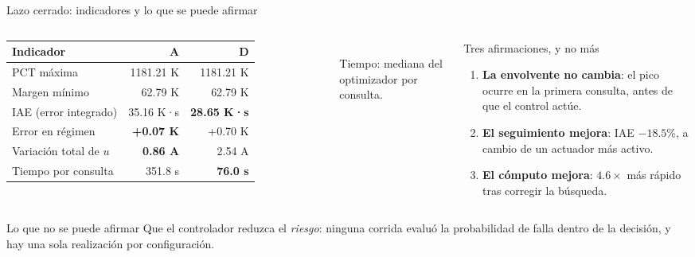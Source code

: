 \documentclass[aspectratio=169,10pt]{beamer}
\newcommand{\key}[1]{{\color{USMBlue}\bfseries #1}}
\begin{document}
\begin{frame}{Lazo cerrado: indicadores y lo que se puede afirmar}
\begin{columns}[T]
\small
\begin{tabular}{@{}lrr@{}}
\toprule
Indicador & A & D\\
\midrule
PCT máxima & 1181.21 K & 1181.21 K\\
Margen mínimo & 62.79 K & 62.79 K\\
IAE (error integrado) & 35.16 K·s & \key{28.65 K·s}\\
Error en régimen & \key{+0.07 K} & +0.70 K\\
Variación total de $u$ & \key{0.86 A} & 2.54 A\\
Tiempo por consulta & 351.8 s & \key{76.0 s}\\
\bottomrule
\end{tabular}\\[.1cm]
\scriptsize\color{MidGray} Tiempo: mediana del optimizador por consulta.
\begin{exampleblock}{Tres afirmaciones, y no más}
\begin{enumerate}\setlength{\itemsep}{.1cm}
\item \textbf{La envolvente no cambia}: el pico ocurre en la primera consulta, antes de que el control actúe.
\item \textbf{El seguimiento mejora}: IAE $-18.5$\%, a cambio de un actuador más activo.
\item \textbf{El cómputo mejora}: $4.6\times$ más rápido tras corregir la búsqueda.
\end{enumerate}
\end{exampleblock}
\end{columns}
\vspace{.25cm}
\begin{alertblock}{Lo que no se puede afirmar}
Que el controlador reduzca el \emph{riesgo}: ninguna corrida evaluó la probabilidad de falla dentro de la decisión, y hay una sola realización por configuración.
\end{alertblock}
\end{frame}
\end{document}
